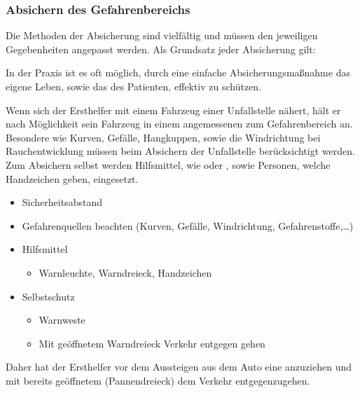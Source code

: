 \subsubsection{Absichern des Gefahrenbereichs}

Die Methoden der Absicherung sind vielfältig und müssen den
jeweiligen Gegebenheiten angepasst werden. Als Grundsatz
jeder Absicherung gilt:


In der Praxis ist es oft möglich, durch
eine einfache Absicherungsmaßnahme das eigene Leben, sowie
das des Patienten, effektiv zu schützen.

{
Wenn sich der Ersthelfer mit einem Fahrzeug einer
Unfallstelle nähert, hält er nach Möglichkeit sein Fahrzeug
in einem angemessenen  zum
Gefahrenbereich an. Besondere  wie
Kurven, Gefälle, Hangkuppen, sowie die Windrichtung bei
Rauchentwicklung müssen beim Absichern der Unfallstelle
berücksichtigt werden. Zum Absichern selbst werden
Hilfsmittel, wie  oder ,
sowie Personen, welche Handzeichen geben, eingesetzt.

\bigskip

\bigskip

}{
\begin{itemize}
  \item Sicherheitsabstand
  \item Gefahrenquellen beachten (Kurven, Gefälle,
  Windrichtung, Gefahrenstoffe,\ldots)
  \item Hilfsmittel
  \begin{itemize}
    \item Warnleuchte, Warndreieck, Handzeichen
  \end{itemize}
  \item Selbstschutz
  \begin{itemize}
    \item Warnweste
    \item Mit geöffnetem Warndreieck
    Verkehr entgegen gehen
  \end{itemize}
\end{itemize}
}{}{}{}




Daher hat der Ersthelfer vor dem Aussteigen aus dem Auto
eine  anzuziehen und mit bereits
geöffnetem  (Pannendreieck) dem 
Verkehr entgegenzugehen. 


